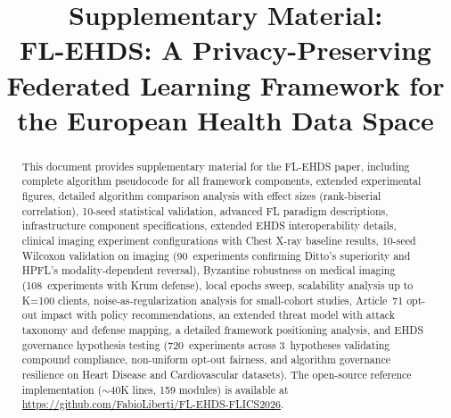 \documentclass[conference]{IEEEtran}
\begin{document}
\renewcommand{\thetable}{S-\Roman{table}}
\renewcommand{\thefigure}{S-\arabic{figure}}

\title{Supplementary Material:\\FL-EHDS: A Privacy-Preserving Federated Learning Framework for the European Health Data Space}

\author{
}

\maketitle

\begin{abstract}
This document provides supplementary material for the FL-EHDS paper, including complete algorithm pseudocode for all framework components, extended experimental figures, detailed algorithm comparison analysis with effect sizes (rank-biserial correlation), 10-seed statistical validation, advanced FL paradigm descriptions, infrastructure component specifications, extended EHDS interoperability details, clinical imaging experiment configurations with Chest X-ray baseline results, 10-seed Wilcoxon validation on imaging (90~experiments confirming Ditto's superiority and HPFL's modality-dependent reversal), Byzantine robustness on medical imaging (108~experiments with Krum defense), local epochs sweep, scalability analysis up to K=100 clients, noise-as-regularization analysis for small-cohort studies, Article~71 opt-out impact with policy recommendations, an extended threat model with attack taxonomy and defense mapping, a detailed framework positioning analysis, and EHDS governance hypothesis testing (720~experiments across 3~hypotheses validating compound compliance, non-uniform opt-out fairness, and algorithm governance resilience on Heart Disease and Cardiovascular datasets). The open-source reference implementation ($\sim$40K lines, 159 modules) is available at \url{https://github.com/FabioLiberti/FL-EHDS-FLICS2026}.
\end{abstract}

\end{document}
